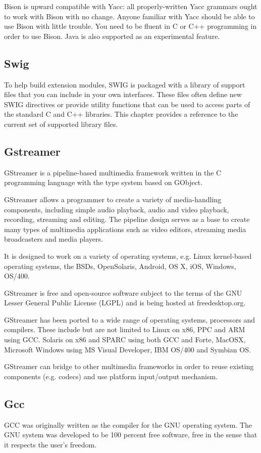 \documentclass[12pt,a4paper,oldfontcommands]{memoir}
\begin{document}
Bison is upward compatible with Yacc: all properly-written Yacc grammars ought to work with Bison with no change. Anyone familiar with Yacc should be able to use Bison with little trouble. You need to be fluent in C or C++ programming in order to use Bison. Java is also supported as an experimental feature\cite{25}.
\subsection{Swig}
To help build extension modules, SWIG is packaged with a library of support files that you can include in your own interfaces. These files often define new SWIG directives or provide utility functions that can be used to access parts of the standard C and C++ libraries. This chapter provides a reference to the current set of supported library files\cite{26}.
\subsection{Gstreamer} 
GStreamer is a pipeline-based multimedia framework written in the C programming language with the type system based on GObject.

GStreamer allows a programmer to create a variety of media-handling components, including simple audio playback, audio and video playback, recording, streaming and editing. The pipeline design serves as a base to create many types of multimedia applications such as video editors, streaming media broadcasters and media players.

It is designed to work on a variety of operating systems, e.g. Linux kernel-based operating systems, the BSDs, OpenSolaris, Android, OS X, iOS, Windows, OS/400.

GStreamer is free and open-source software subject to the terms of the GNU Lesser General Public License (LGPL) and is being hosted at freedesktop.org\cite{27}.
 	
GStreamer has been ported to a wide range of operating systems, processors and compilers. These include but are not limited to Linux on x86, PPC and ARM using GCC. Solaris on x86 and SPARC using both GCC and Forte, MacOSX, Microsoft Windows using MS Visual Developer, IBM OS/400 and Symbian OS.

GStreamer can bridge to other multimedia frameworks in order to reuse existing components (e.g. codecs) and use platform input/output mechanism\cite{28}.

\subsection{Gcc}
GCC was originally written as the compiler for the GNU operating system. The GNU system was developed to be 100 percent free software, free in the sense that it respects the user's freedom.
\end{document}
